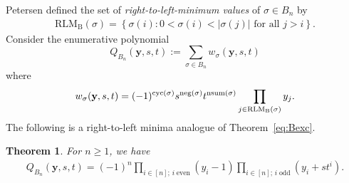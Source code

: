 \documentclass[12pt,reqno]{amsart}
\numberwithin{equation}{section}
\newcommand\cyc{\mathop{ \rm cyc}}
\newcounter{num}
\def\y{\mathbf{ y}}
\def\cyc{\mathop{\rm cyc}}
\newtheorem{thm}{Theorem}
\begin{document}
Petersen \cite{Pe11} defined the set of \emph{right-to-left-minimum values} of $\sigma\in B_n$ by
\begin{align*}
	\mathrm{RLM_B}(\sigma)=\left\{ \sigma(i):0<\sigma(i)<|\sigma(j)| \text{ for all } j>i \right\}.
\end{align*}
Consider the enumerative polynomial
$$
Q_{B_n}(\y,s,t):=\sum_{\sigma\in B_n}w_{\sigma}(\y,s,t)
$$
where 
$$
w_{\sigma}(\y,s, t)=(-1)^{\cyc(\sigma)}s^{\rm neg(\sigma)}t^{{\rm nsum}(\sigma)}\prod_{j\in\mathrm{RLM_B(\sigma)}}y_j.
$$
The following is a right-to-left minima analogue of Theorem~\ref{eq:Bexc}.
\begin{thm}\label{thm:rlmB}
	For $n\ge1$,  we have
	\begin{align}\label{eq:RLM_B}
		Q_{B_n}(\y,s,t)=(-1)^n\prod_{i\in [n];\,  i\; \text{even}}(y_i-1)\prod_{i \in [n];\, i \;\text{odd}}(y_i+st^i).
	\end{align}
\end{thm}
\end{document}
